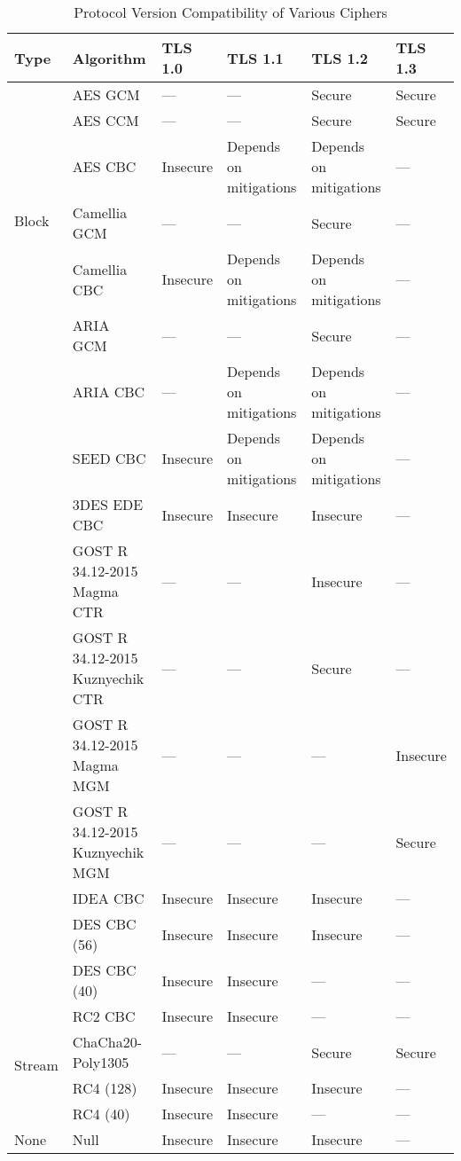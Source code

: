\documentclass[11pt]{scrartcl} %
\begin{document}
\begin{table}[h!]
    \centering
    \renewcommand{\arraystretch}{1.3}
    \begin{tabular}{|p{2cm}|p{3cm}|p{2cm}|p{2cm}|p{2cm}|p{2cm}|}
        \hline
        \textbf{Type} & \textbf{Algorithm} & \textbf{TLS 1.0} & \textbf{TLS 1.1} & \textbf{TLS 1.2} & \textbf{TLS 1.3} \\ \hline
        
        \multirow{6}{*}{Block} & AES GCM & — & — & Secure & Secure \\ \cline{2-6}
         & AES CCM & — & — & Secure & Secure \\ \cline{2-6}
         & AES CBC & Insecure & Depends on mitigations & Depends on mitigations & — \\ \cline{2-6}
         & Camellia GCM & — & — & Secure & — \\ \cline{2-6}
         & Camellia CBC & Insecure & Depends on mitigations & Depends on mitigations & — \\ \cline{2-6}
         & ARIA GCM & — & — & Secure & — \\ \cline{2-6}
         & ARIA CBC & — & Depends on mitigations & Depends on mitigations & — \\ \cline{2-6}
         & SEED CBC & Insecure & Depends on mitigations & Depends on mitigations & — \\ \cline{2-6}
         & 3DES EDE CBC & Insecure & Insecure & Insecure & — \\ \cline{2-6}
         & GOST R 34.12-2015 Magma CTR & — & — & Insecure & — \\ \cline{2-6}
         & GOST R 34.12-2015 Kuznyechik CTR & — & — & Secure & — \\ \cline{2-6}
         & GOST R 34.12-2015 Magma MGM & — & — & — & Insecure \\ \cline{2-6}
         & GOST R 34.12-2015 Kuznyechik MGM & — & — & — & Secure \\ \cline{2-6}
         & IDEA CBC & Insecure & Insecure & Insecure & — \\ \cline{2-6}
         & DES CBC (56) & Insecure & Insecure & Insecure & — \\ \cline{2-6}
         & DES CBC (40) & Insecure & Insecure & — & — \\ \cline{2-6}
         & RC2 CBC & Insecure & Insecure & — & — \\ \hline
         
        \multirow{2}{*}{Stream} & ChaCha20-Poly1305 & — & — & Secure & Secure \\ \cline{2-6}
         & RC4 (128) & Insecure & Insecure & Insecure & — \\ \cline{2-6}
         & RC4 (40) & Insecure & Insecure & — & — \\ \hline
         
        None & Null & Insecure & Insecure & Insecure & — \\ \hline
    \end{tabular}
    \caption{Protocol Version Compatibility of Various Ciphers}
\end{table}
\end{document}
